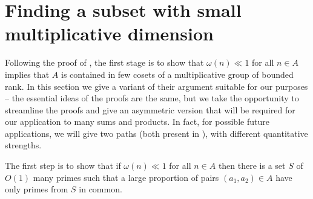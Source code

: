 \documentclass{amsart}
\theoremstyle{definition}
\begin{document}
\section{Finding a subset with small multiplicative dimension}\label{sec-comb}
Following the proof of \cite{HRSZ25}, the first stage is to show that $\omega(n)\ll 1$ for all $n\in A$ implies that $A$ is contained in few cosets of a multiplicative group of bounded rank. In this section we give a variant of their argument suitable for our purposes -- the essential ideas of the proofs are the same, but we take the opportunity to streamline the proofs and give an asymmetric version that will be required for our application to many sums and products. In fact, for possible future applications, we will give two paths (both present in \cite{HRSZ25}), with different quantitative strengths. 

The first step is to show that if $\omega(n)\ll 1$ for all $n\in A$ then there is a set $S$ of $O(1)$ many primes such that a large proportion of pairs $(a_1,a_2)\in A$ have only primes from $S$ in common.
\end{document}

